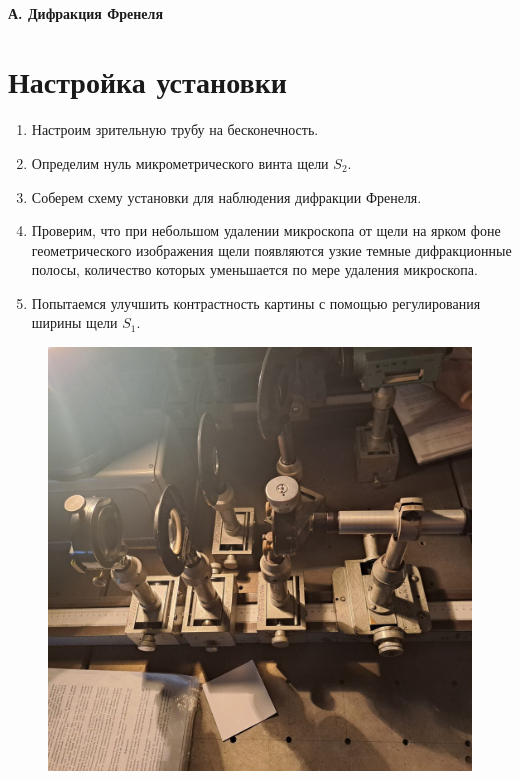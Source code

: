 \documentclass[14pt, a4paper]{report}
\begin{document}
\paragraph*{А. Дифракция Френеля}

\section{Настройка установки}

\begin{enumerate}

\item Настроим зрительную трубу на бесконечность.

\item Определим нуль микрометрического винта щели $S_2$.

\item Соберем схему установки для наблюдения дифракции Френеля.

\item Проверим, что при небольшом удалении микроскопа от щели на ярком фоне геометрического изображения щели появляются узкие темные дифракционные полосы, количество которых уменьшается по мере удаления микроскопа.

\item Попытаемся улучшить контрастность картины с помощью регулирования ширины щели $S_1$.

\end{enumerate}

\begin{figure}[H]
\centering
\includegraphics[scale=0.2]{../images/431_5}
\end{figure}
\end{document}

